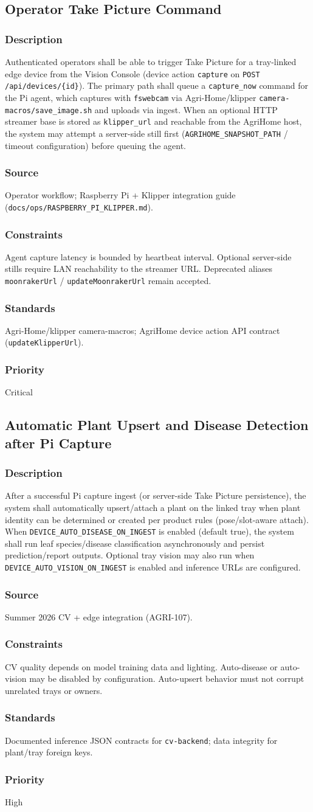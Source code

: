 \documentclass[11pt,letterpaper]{article}
\newcommand{\reqblock}[5]{%
\subsubsection{Description} #1
\subsubsection{Source} #2
\subsubsection{Constraints} #3
\subsubsection{Standards} #4
\subsubsection{Priority} #5
}
\begin{document}
\subsection{Operator Take Picture Command}
\reqblock
{Authenticated operators shall be able to trigger Take Picture for a tray-linked edge device from the
Vision Console (device action \texttt{capture} on \texttt{POST /api/devices/\{id\}}). The primary path shall
queue a \texttt{capture\_now} command for the Pi agent, which captures with \texttt{fswebcam} via
Agri-Home/klipper \texttt{camera-macros/save\_image.sh} and uploads via ingest. When an optional HTTP
streamer base is stored as \texttt{klipper\_url} and reachable from the AgriHome host, the system may
attempt a server-side still first (\texttt{AGRIHOME\_SNAPSHOT\_PATH} / timeout configuration) before
queuing the agent.}
{Operator workflow; Raspberry Pi + Klipper integration guide (\texttt{docs/ops/RASPBERRY\_PI\_KLIPPER.md}).}
{Agent capture latency is bounded by heartbeat interval. Optional server-side stills require LAN
reachability to the streamer URL. Deprecated aliases \texttt{moonrakerUrl} / \texttt{updateMoonrakerUrl}
remain accepted.}
{Agri-Home/klipper camera-macros; AgriHome device action API contract (\texttt{updateKlipperUrl}).}
{Critical}

\subsection{Automatic Plant Upsert and Disease Detection after Pi Capture}
\reqblock
{After a successful Pi capture ingest (or server-side Take Picture persistence), the system shall
automatically upsert/attach a plant on the linked tray when plant identity can be determined or created
per product rules (pose/slot-aware attach). When \texttt{DEVICE\_AUTO\_DISEASE\_ON\_INGEST} is enabled
(default true), the system shall run leaf species/disease classification asynchronously and persist
prediction/report outputs. Optional tray vision may also run when
\texttt{DEVICE\_AUTO\_VISION\_ON\_INGEST} is enabled and inference URLs are configured.}
{Summer 2026 CV + edge integration (AGRI-107).}
{CV quality depends on model training data and lighting. Auto-disease or auto-vision may be disabled
by configuration. Auto-upsert behavior must not corrupt unrelated trays or owners.}
{Documented inference JSON contracts for \texttt{cv-backend}; data integrity for plant/tray foreign keys.}
{High}
\end{document}
